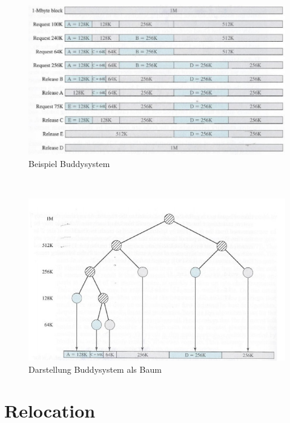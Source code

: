 \documentclass[a4paper]{scrreprt}
\begin{document}
\begin{figure}[ht]
\centering
\includegraphics[scale=0.50]{buddysystem.png}
\caption{Beispiel Buddysystem}
\end{figure}
  \ \\
\begin{figure}[ht]
\centering
\includegraphics[scale=0.5]{buddysystemtree.png}
\caption{Darstellung Buddysystem als Baum}
\end{figure}
\newpage

\section{Relocation}
\end{document}
